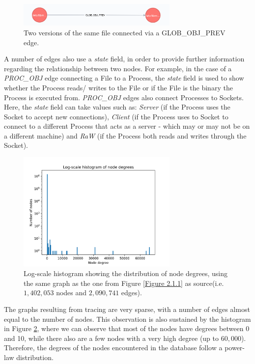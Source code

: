 	\begin{figure}[H]
		\centering

		\includegraphics[width=0.7\textwidth]{graphics/GLOB_OBJ_PREV}
		\caption{
			Two versions of the same file connected via a GLOB\_OBJ\_PREV edge.
		}
		\label{Figure 2.1.2}
	\end{figure}
	A number of edges also use a \textit{state} field, in order to provide further information regarding the relationship between two nodes. For example, in the case of a \textit{PROC\_OBJ} edge connecting a File to a Process, the \textit{state} field is used to show whether the Process reads/ writes to the File or if the File is the binary the Process is executed from. \textit{PROC\_OBJ} edges also connect Processes to Sockets. Here, the \textit{state} field can take values such as: \textit{Server} (if the Process uses the Socket to accept new connections), \textit{Client} (if the Process uses to Socket to connect to a different Process that acts as a server - which may or may not be on a different machine)  and \textit{RaW} (if the Process both reads and writes through the Socket).
	\begin{figure}[H]
		\centering
		
		\includegraphics[width=0.7\textwidth]{graphics/node_degree_hist}
		\caption[Log-scale distribution of node degrees]{
			Log-scale histogram showing the distribution of node degrees, using the same graph as the one from Figure \ref{Figure 2.1.1} as source(i.e. $1,402,053$ nodes and $2,090,741$ edges).
		}
		\label{Figure 2.1.3}
	\end{figure}
	 
	 The graphs resulting from tracing are very sparse, with a number of edges almost equal to the number of nodes. This observation is also sustained by the histogram in Figure \ref{Figure 2.1.3}, where we can observe that most of the nodes have degrees between 0 and 10, while there also are a few nodes with a very high degree (up to $60, 000$). Therefore, the degrees of the nodes encountered in the database follow a power-law distribution\cite{Clauset:2009:PDE:1655787.1655789}.
	 
